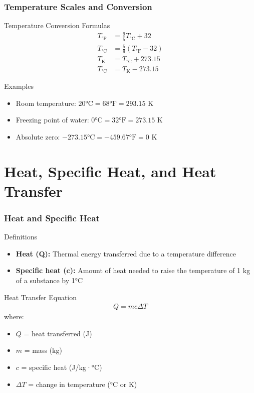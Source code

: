 \documentclass{beamer}
\begin{document}
\begin{frame}
    \frametitle{Temperature Scales and Conversion}
    \begin{block}{Temperature Conversion Formulas}
        \begin{align*}
            T_{\text{°F}} &= \frac{9}{5}T_{\text{°C}} + 32 \\
            T_{\text{°C}} &= \frac{5}{9}(T_{\text{°F}} - 32) \\
            T_{\text{K}} &= T_{\text{°C}} + 273.15 \\
            T_{\text{°C}} &= T_{\text{K}} - 273.15
        \end{align*}
    \end{block}
    
    \begin{exampleblock}{Examples}
        \begin{itemize}
            \item Room temperature: $20\text{°C} = 68\text{°F} = 293.15\text{ K}$
            \item Freezing point of water: $0\text{°C} = 32\text{°F} = 273.15\text{ K}$
            \item Absolute zero: $-273.15\text{°C} = -459.67\text{°F} = 0\text{ K}$
        \end{itemize}
    \end{exampleblock}
\end{frame}

\section{Heat, Specific Heat, and Heat Transfer}

\begin{frame}
    \frametitle{Heat and Specific Heat}
    \begin{block}{Definitions}
        \begin{itemize}
            \item \textbf{Heat (Q):} Thermal energy transferred due to a temperature difference
            \item \textbf{Specific heat (c):} Amount of heat needed to raise the temperature of 1 kg of a substance by 1°C
        \end{itemize}
    \end{block}
    
    \begin{alertblock}{Heat Transfer Equation}
        \begin{align*}
            Q = mc\Delta T
        \end{align*}
        where:
        \begin{itemize}
            \item $Q$ = heat transferred (J)
            \item $m$ = mass (kg)
            \item $c$ = specific heat (J/kg·°C)
            \item $\Delta T$ = change in temperature (°C or K)
        \end{itemize}
    \end{alertblock}
\end{frame}
\end{document}
